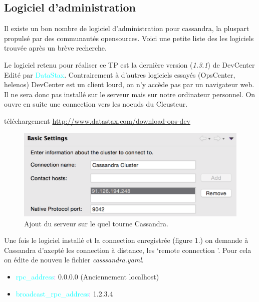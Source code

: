 \subsection{Logiciel d'administration}
\par Il existe un bon nombre de logiciel d'administration pour cassandra, la pluspart propulsé par des communautés opensources.
Voici une petite liste des les logiciels trouvée après un brève recherche.
\par Le logiciel retenu pour réaliser ce TP est la dernière version (\textit{1.3.1}) de DevCenter Edité par \textcolor{cyan}{DataStax}.
Contrairement à d'autres logiciels essayés (OpsCenter, helenos) DevCenter est un client lourd, on n'y accède pas par
un navigateur web. Il ne sera donc pas installé sur le serveur mais sur notre ordinateur personnel. On ouvre en suite
une connection vers les noeuds du Cleusteur.
\begin{block}{téléchargement}
\href{http://www.datastax.com/download-ops-dev}{http://www.datastax.com/download-ops-dev}
\end{block}

\begin{figure}[h!]
\centering
\includegraphics[scale=0.5]{img/ip.png}
\caption{Ajout du serveur sur le quel tourne Cassandra.}
\end{figure}

\par Une fois le logiciel installé et la connection enregistrée (figure 1.) on demande à Cassandra d'axepté les connection à 
distance, les \lq remote connection \rq. Pour cela on édite de nouveu le fichier \textit{casssandra.yaml}.
\begin{itemize}
\item \textcolor{cyan}{rpc\_address}\textcolor{magenta}{:} 0.0.0.0 (Anciennement localhost)
\item \textcolor{cyan}{broadcast\_rpc\_address}\textcolor{magenta}{:} 1.2.3.4
\end{itemize}

